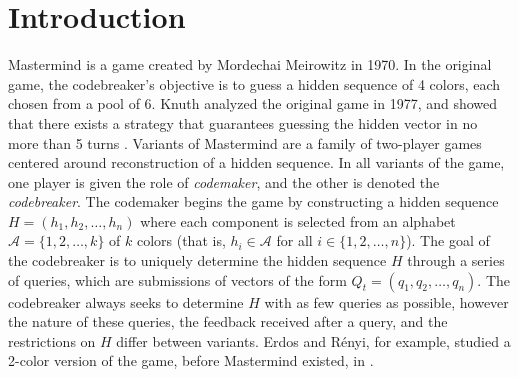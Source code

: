 \documentclass[12pt, a4paper]{article}
\author{\theauthor}
\title{\thetitle}
\date{\duedate}
\begin{document}
\maketitle
\begin{abstract}
	We study variants of Mastermind, a popular board game in which the objective is sequence reconstruction. In this two-player game, the so-called \textit{codemaker} constructs a hidden sequence $H = (h_1, h_2, \ldots, h_n)$ of colors selected from an alphabet $\mathcal{A} = \{1,2,\ldots, k\}$ (\textit{i.e.,} $h_i\in\mathcal{A}$ for all $i\in\{1,2,\ldots, n\}$). The game then proceeds in turns, each of which consists of two parts: in turn $t$, the second player (the \textit{codebreaker}) first submits a query sequence $Q_t = (q_1, q_2, \ldots, q_n)$ with $q_i\in \mathcal{A}$ for all $i$, and second receives feedback $\Delta(Q_t, H)$, where $\Delta$ is some agreed-upon function of distance between two sequences with $n$ components. The game terminates when $Q_t = H$, and the codebreaker seeks to end the game in as few turns as possible. Throughout we let $f(n,k)$ denote the smallest integer such that the codebreaker can determine any $H$ in $f(n,k)$ turns. We prove three main results: First, when $H$ is known to be a permutation of $\{1,2,\ldots, n\}$, we prove that $f(n, n)\ge n - \log\log(n)$ for all sufficiently large $n$. Second, we show that Knuth's Minimax algorithm identifies any $H$ in at most $nk$ queries. Third, when feedback is not received until all queries have been submitted, we show that $f(n,k)=\Omega(n\log k)$.
\end{abstract}

\section{Introduction}
Mastermind is a game created by Mordechai Meirowitz in 1970. In the original game, the codebreaker's objective is to guess a hidden sequence of 4 colors, each chosen from a pool of 6. Knuth analyzed the original game in 1977, and showed that there exists a strategy that guarantees guessing the hidden vector in no more than 5 turns \cite{DK76}. Variants of Mastermind are a family of two-player games centered around reconstruction of a hidden sequence. In all variants of the game, one player is given the role of \textit{codemaker}, and the other is denoted the \textit{codebreaker}. The codemaker begins the game by constructing a hidden sequence $H = (h_1, h_2, \ldots, h_n)$ where each component is selected from an alphabet $\mathcal{A} = \{1,2,\ldots,k\}$ of $k$ colors (that is, $h_i\in\mathcal{A}$ for all $i\in\{1,2,\ldots,n\}$). The goal of the codebreaker is to uniquely determine the hidden sequence $H$ through a series of queries, which are submissions of vectors of the form $Q_t = (q_1, q_2, \ldots, q_n)$. The codebreaker always seeks to determine $H$ with as few queries as possible, however the nature of these queries, the feedback received after a query, and the restrictions on $H$ differ between variants. Erdos and R\'enyi, for example, studied a 2-color version of the game, before Mastermind existed, in \cite{ER63}.
\end{document}
